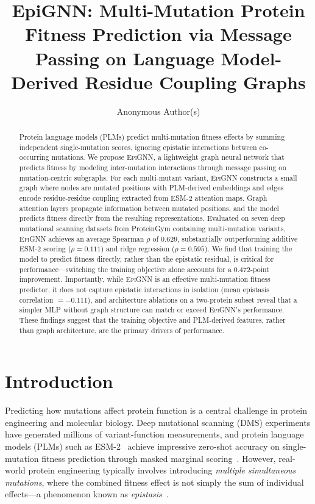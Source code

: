 \documentclass{article}
\title{EpiGNN: Multi-Mutation Protein Fitness Prediction via Message Passing on Language Model-Derived Residue Coupling Graphs}
\author{
  Anonymous Author(s)
}
\newcommand{\epignn}{\textsc{EpiGNN}}
\begin{document}
\maketitle

\begin{abstract}
Protein language models (PLMs) predict multi-mutation fitness effects by summing independent single-mutation scores, ignoring epistatic interactions between co-occurring mutations.
We propose \epignn{}, a lightweight graph neural network that predicts fitness by modeling inter-mutation interactions through message passing on mutation-centric subgraphs.
For each multi-mutant variant, \epignn{} constructs a small graph where nodes are mutated positions with PLM-derived embeddings and edges encode residue-residue coupling extracted from ESM-2 attention maps.
Graph attention layers propagate information between mutated positions, and the model predicts fitness directly from the resulting representations.
Evaluated on seven deep mutational scanning datasets from ProteinGym containing multi-mutation variants, \epignn{} achieves an average Spearman $\rho$ of 0.629, substantially outperforming additive ESM-2 scoring ($\rho = 0.111$) and ridge regression ($\rho = 0.595$).
We find that training the model to predict fitness directly, rather than the epistatic residual, is critical for performance---switching the training objective alone accounts for a 0.472-point improvement.
Importantly, while \epignn{} is an effective multi-mutation fitness predictor, it does not capture epistatic interactions in isolation (mean epistasis correlation $= -0.111$), and architecture ablations on a two-protein subset reveal that a simpler MLP without graph structure can match or exceed \epignn{}'s performance.
These findings suggest that the training objective and PLM-derived features, rather than graph architecture, are the primary drivers of performance.
\end{abstract}

\section{Introduction}

Predicting how mutations affect protein function is a central challenge in protein engineering and molecular biology.
Deep mutational scanning (DMS) experiments have generated millions of variant-function measurements, and protein language models (PLMs) such as ESM-2~\citep{lin2023evolutionary} achieve impressive zero-shot accuracy on single-mutation fitness prediction through masked marginal scoring~\citep{meier2021language}.
However, real-world protein engineering typically involves introducing \emph{multiple simultaneous mutations}, where the combined fitness effect is not simply the sum of individual effects---a phenomenon known as \emph{epistasis}~\citep{wu2016adaptation}.
\end{document}

